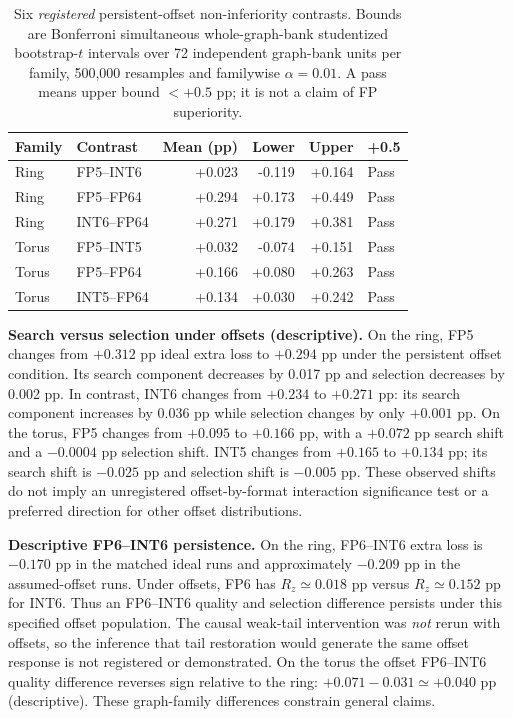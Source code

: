 \documentclass[11pt,a4paper,oneside]{report}
\begin{document}
\begin{table}[htbp]\centering\small
\begin{tabular}{@{}llrrrl@{}}\toprule
Family & Contrast & Mean (pp) & Lower & Upper & +0.5\\\midrule
Ring & FP5--INT6 & +0.023 & -0.119 & +0.164 & Pass\\
Ring & FP5--FP64 & +0.294 & +0.173 & +0.449 & Pass\\
Ring & INT6--FP64 & +0.271 & +0.179 & +0.381 & Pass\\
Torus & FP5--INT5 & +0.032 & -0.074 & +0.151 & Pass\\
Torus & FP5--FP64 & +0.166 & +0.080 & +0.263 & Pass\\
Torus & INT5--FP64 & +0.134 & +0.030 & +0.242 & Pass\\\bottomrule
\end{tabular}
\caption{Six \emph{registered} persistent-offset
non-inferiority contrasts. Bounds are Bonferroni
simultaneous whole-graph-bank studentized
bootstrap-$t$ intervals over 72 independent
graph-bank units per family, 500,000
resamples and familywise $\alpha=0.01$.
A pass means upper bound $<+0.5$ pp;
it is not a claim of FP superiority.}
\label{tab:device-checkpoint}
\end{table}

\noindent\textbf{Search versus selection under offsets
(descriptive).} On the ring, FP5 changes
from $+0.312$ pp ideal extra loss
to $+0.294$ pp under the persistent
offset condition. Its search component
decreases by 0.017 pp and selection
decreases by 0.002 pp. In contrast,
INT6 changes from $+0.234$ to
$+0.271$ pp: its search component
increases by 0.036 pp while selection
changes by only $+0.001$ pp.
On the torus, FP5 changes from
$+0.095$ to $+0.166$ pp,
with a $+0.072$ pp search shift and
a $-0.0004$ pp selection shift.
INT5 changes from $+0.165$ to
$+0.134$ pp; its search shift is
$-0.025$ pp and selection shift is
$-0.005$ pp. These observed shifts
do not imply an unregistered
offset-by-format interaction significance
test or a preferred direction for other
offset distributions.

\noindent\textbf{Descriptive FP6--INT6 persistence.}
On the ring, FP6--INT6 extra loss
is $-0.170$ pp in the matched ideal
runs and approximately $-0.209$ pp
in the assumed-offset runs. Under
offsets, FP6 has $R_z\simeq0.018$
pp versus $R_z\simeq0.152$ pp for
INT6. Thus an FP6--INT6 quality and
selection difference persists under
this specified offset population.
The causal weak-tail intervention
was \emph{not} rerun with offsets,
so the inference that tail restoration
would generate the same offset response
is not registered or demonstrated.
On the torus the offset FP6--INT6
quality difference reverses sign
relative to the ring:
$+0.071-0.031\simeq+0.040$ pp
(descriptive). These graph-family
differences constrain general claims.
\end{document}
